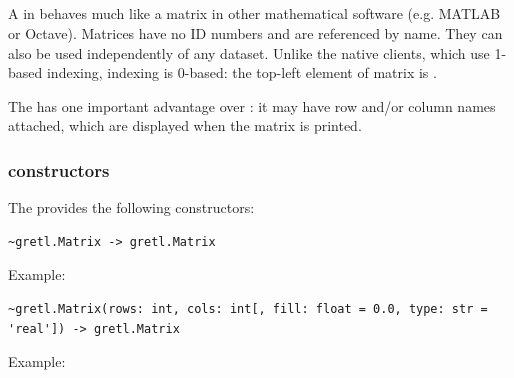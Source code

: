 \subsection[gretl.Matrix class]{\classpymatrix}\label{sec:classpymatrix}
A  in \gretl behaves much like a matrix in other
mathematical software (e.g. MATLAB or Octave). Matrices have no
ID numbers and are referenced by name. They can also be used
independently of any dataset. Unlike the native \gretl clients,
which use 1-based indexing, \gretlmatrix indexing is 0-based:
the top-left element of matrix  is .

The \classpymatrix has one important advantage over
: it may have row and/or column names
attached, which are displayed when the matrix is printed.


\subsubsection{\classpymatrixb constructors}
The \classpymatrix provides the following constructors:

\begin{lstlisting}[style=pythonstylefoot]
~gretl.Matrix -> gretl.Matrix
\end{lstlisting}
Example:\newline
{}

\begin{lstlisting}[style=pythonstylefoot]
~gretl.Matrix(rows: int, cols: int[, fill: float = 0.0, type: str = 'real']) -> gretl.Matrix
\end{lstlisting}
Example:\newline
{}\\


